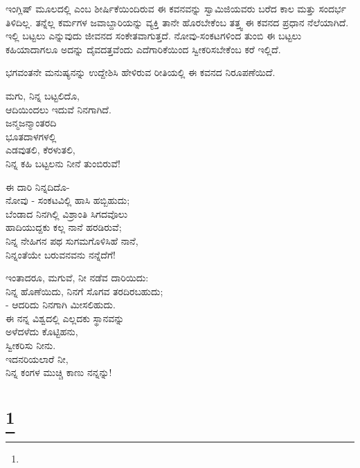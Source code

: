 ಇಂಗ್ಲಿಷ್ ಮೂಲದಲ್ಲಿ  ಎಂಬ ಶೀರ್ಷಿಕೆಯಿಂದಿರುವ ಈ ಕವನವನ್ನು ಸ್ವಾಮಿಜಿಯವರು ಬರೆದ ಕಾಲ ಮತ್ತು ಸಂದರ್ಭ ತಿಳಿದಿಲ್ಲ. ತನ್ನೆಲ್ಲ ಕರ್ಮಗಳ ಜವಾಬ್ದಾರಿಯನ್ನು ವ್ಯಕ್ತಿ ತಾನೇ ಹೊರಬೇಕೆಂಬ ತತ್ತ್ವ ಈ ಕವನದ ಪ್ರಧಾನ ನೆಲೆಯಾಗಿದೆ. ಇಲ್ಲಿ ಬಟ್ಟಲು ಎನ್ನುವುದು ಜೀವನದ ಸಂಕೇತವಾಗುತ್ತದೆ. ನೋವು-ಸಂಕಟಗಳಿಂದ ತುಂಬಿ ಈ ಬಟ್ಟಲು ಕಹಿಯಾದಾಗಲೂ ಅದನ್ನು ದೈವದತ್ತವೆಂದು ಎದೆಗಾರಿಕೆಯಿಂದ ಸ್ವೀಕರಿಸಬೇಕೆಂಬ ಕರೆ ಇಲ್ಲಿದೆ.

ಭಗವಂತನೇ ಮನುಷ್ಯನನ್ನು ಉದ್ದೇಶಿಸಿ ಹೇಳಿರುವ ರೀತಿಯಲ್ಲಿ ಈ ಕವನದ ನಿರೂಪಣೆಯಿದೆ.

\begin{myquote}
ಮಗು, ನಿನ್ನ ಬಟ್ಟಲಿದೊ,\\ಆದಿಯಿಂದಲು ಇದುವೆ ನಿನಗಾಗಿದೆ.\\ಜನ್ಮಜನ್ಮಾಂತರದಿ\\ಭೂತದಾಳಗಳಲ್ಲಿ\\ಎಡವುತಲಿ, ಕೆರಳುತಲಿ,\\ನಿನ್ನ ಕಹಿ ಬಟ್ಟಲನು ನೀನೆ ತುಂಬಿರುವೆ!
\end{myquote}

\begin{myquote}
ಈ ದಾರಿ ನಿನ್ನದಿದೊ-\\ನೋವು - ಸಂಕಟವಿಲ್ಲಿ ಹಾಸಿ ಹಬ್ಬಿಹುದು;\\ಬೆಂಡಾದ ನಿನಗಿಲ್ಲಿ ವಿಶ್ರಾಂತಿ ಸಿಗದವೊಲು\\ಹಾದಿಯುದ್ದಕು ಕಲ್ಲ ನಾನೆ ಹರಡಿರುವೆ;\\ನಿನ್ನ ನೇಹಿಗನ ಪಥ ಸುಗಮಗೊಳಿಸಿಹೆ ನಾನೆ,\\ನಿನ್ನಂತೆಯೇ ಬರುವನವನು ನನ್ನೆದೆಗೆ!
\end{myquote}

\begin{myquote}
ಇಂತಾದರೂ, ಮಗುವೆ, ನೀ ನಡೆವ ದಾರಿಯಿದು:\\ನಿನ್ನ ಹೊಣೆಯಿದು, ನಿನಗೆ ಸೊಗವ ತರದಿರಬಹುದು;\\
- ಆದರಿದು ನಿನಗಾಗಿ ಮೀಸಲಿಹುದು.\\ಈ ನನ್ನ ವಿಶ್ವದಲ್ಲಿ ಎಲ್ಲದಕು ಸ್ಥಾನವನ್ನು\\ಅಳೆದಳೆದು ಕೊಟ್ಟಿಹನು,\\ಸ್ವೀಕರಿಸು ನೀನು.\\ಇದನರಿಯಲಾರೆ ನೀ,\\ನಿನ್ನ ಕಂಗಳ ಮುಚ್ಚಿ ಕಾಣು ನನ್ನನ್ನು!
\end{myquote}

\selecteng

\chapter[A BENEDICTION]{\protect\footnote{}}

\begin{myquote}
\end{myquote}

